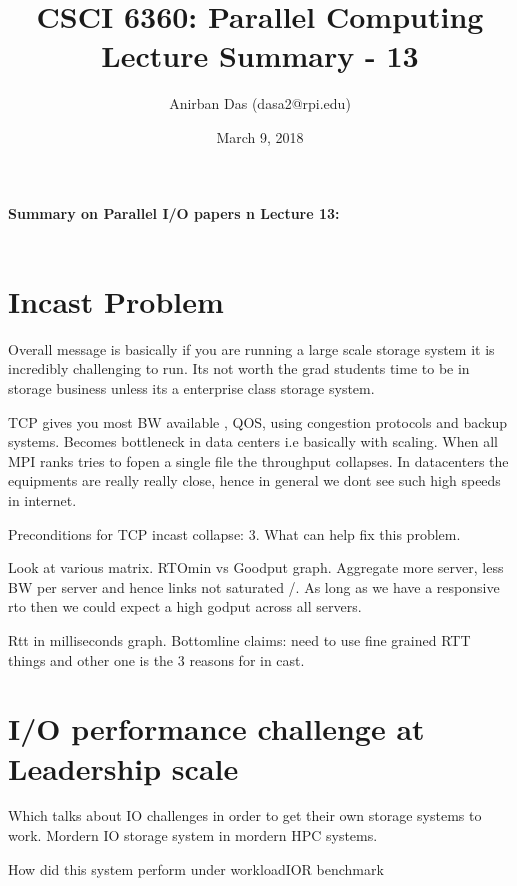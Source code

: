 \documentclass[a4paper,12 pt]{article}
\title{\vspace{-2.0cm}CSCI 6360: Parallel Computing Lecture Summary - 13}
\author{Anirban Das (dasa2@rpi.edu) }
\date{March 9, 2018}
\begin{document}
\maketitle

\paragraph{Summary on Parallel I/O papers n Lecture 13:\\\\}

\section{Incast Problem} Overall message is basically if you are running a large scale storage system it is incredibly challenging to run. Its not worth the grad students time to be in storage business unless its a enterprise class storage system.

TCP gives you most BW available , QOS, using congestion protocols and backup systems. Becomes bottleneck in data centers i.e basically with scaling. When all MPI ranks tries to fopen a single file the throughput collapses. In datacenters the equipments are really really close, hence in general we dont see such high speeds in internet.

Preconditions for TCP incast collapse: 3. What can help fix this problem.

Look at various matrix. RTOmin vs Goodput graph. Aggregate more server, less BW per server and hence links not saturated /. As long as we have a responsive rto then we could expect a high godput across all servers. 

Rtt in milliseconds graph.
 Bottomline claims: need to use fine grained RTT things and other one is the 3 reasons for in cast.
 
\section{I/O performance challenge at Leadership scale} Which talks about IO challenges in order to get their own storage systems to work. Mordern IO storage system in mordern HPC systems. 

How did this system perform under workloadIOR benchmark
\end{document}
